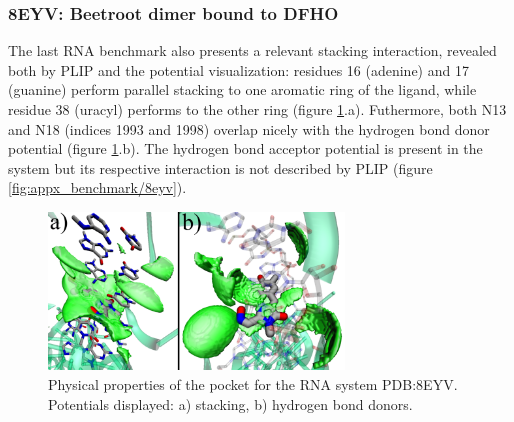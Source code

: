     \subsubsection{8EYV: Beetroot dimer bound to DFHO}
      The last RNA benchmark also presents a relevant stacking interaction, revealed both by PLIP and the potential visualization: residues 16 (adenine) and 17 (guanine) perform parallel stacking to one aromatic ring of the ligand, while residue 38 (uracyl) performs to the other ring (figure \ref{fig:benchmark/8eyv}.a). Futhermore, both N13 and N18 (indices 1993 and 1998) overlap nicely with the hydrogen bond donor potential (figure \ref{fig:benchmark/8eyv}.b). The hydrogen bond acceptor potential is present in the system but its respective interaction is not described by PLIP (figure \ref{fig:appx_benchmark/8eyv}).

      \begin{figure}[H]
        \centering
        \includegraphics[width=0.7\textwidth]{figures/results/benchmark_rna/8eyv.png}
        \caption{\label{fig:benchmark/8eyv} Physical properties of the pocket for the RNA system PDB:8EYV. Potentials displayed: a) stacking, b) hydrogen bond donors.}
      \end{figure}


